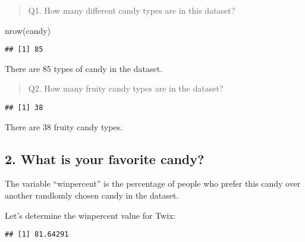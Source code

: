 \documentclass[
]{article}
\newenvironment{Shaded}{\begin{snugshade}}{\end{snugshade}}
\newcommand{\FunctionTok}[1]{\textcolor[rgb]{0.00,0.00,0.00}{#1}}
\newcommand{\NormalTok}[1]{#1}
\newcommand{\SpecialCharTok}[1]{\textcolor[rgb]{0.00,0.00,0.00}{#1}}
\newcommand{\StringTok}[1]{\textcolor[rgb]{0.31,0.60,0.02}{#1}}
\begin{document}
\begin{quote}
Q1. How many different candy types are in this dataset?
\end{quote}

\begin{Shaded}
\begin{Highlighting}[]
\FunctionTok{nrow}\NormalTok{(candy)}
\end{Highlighting}
\end{Shaded}

\begin{verbatim}
## [1] 85
\end{verbatim}

There are 85 types of candy in the dataset.

\begin{quote}
Q2. How many fruity candy types are in the dataset?
\end{quote}

\begin{Shaded}
\end{Shaded}

\begin{verbatim}
## [1] 38
\end{verbatim}

There are 38 fruity candy types.

\hypertarget{what-is-your-favorite-candy}{%
\subsection{2. What is your favorite
candy?}\label{what-is-your-favorite-candy}}

The variable ``winpercent'' is the percentage of people who prefer this
candy over another randlomly chosen candy in the dataset.

Let's determine the winpercent value for Twix:

\begin{Shaded}
\end{Shaded}

\begin{verbatim}
## [1] 81.64291
\end{verbatim}
\end{document}
